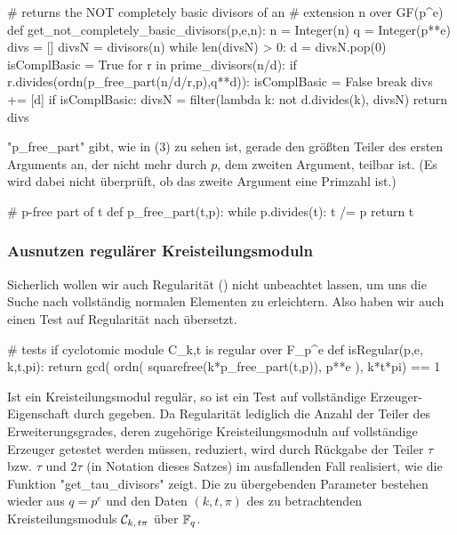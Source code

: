 \begin{sagecode}[caption={[\texttt{get\_not\_completely\_basic\_divisors} aus 
 \url{../Sage/enumeratePCNs.spyx}]Aus \url{../Sage/enumeratePCNs.spyx}},
  label=lst:get_completely_basic_divisors]
# returns the NOT completely basic divisors of an 
# extension n over GF(p^e)
def get_not_completely_basic_divisors(p,e,n):
    n = Integer(n)
    q = Integer(p**e)
    divs = []
    divsN = divisors(n)
    while len(divsN) > 0:
        d = divsN.pop(0)
        isComplBasic = True
        for r in prime_divisors(n/d):
            if r.divides(ordn(p_free_part(n/d/r,p),q**d)):
                isComplBasic = False
                break
        divs += [d]
        if isComplBasic: 
            divsN = filter(lambda k: not d.divides(k), divsN)
    return divs
\end{sagecode}

"p_free_part" gibt, wie in  (3) zu sehen ist,
gerade den größten Teiler des ersten Arguments an, der nicht mehr durch $p$,
dem zweiten Argument, teilbar ist. (Es wird dabei nicht überprüft, ob das zweite
Argument eine Primzahl ist.)


\begin{sagecode}[caption={[\texttt{p\_free\_part} aus 
 \url{../Sage/enumeratePCNs.spyx}]Aus \url{../Sage/enumeratePCNs.spyx}}]
# p-free part of t
def p_free_part(t,p):
    while p.divides(t):
        t /= p
    return t
\end{sagecode}




\subsubsection{Ausnutzen regulärer Kreisteilungsmoduln}

Sicherlich wollen wir auch Regularität () nicht unbeachtet
lassen, um uns die Suche nach vollständig normalen Elementen zu erleichtern.
Also haben wir auch einen Test auf Regularität nach \sage übersetzt.

\begin{sagecode}[caption={[\texttt{isRegular} aus 
 \url{../Sage/enumeratePCNs.spyx}]Aus \url{../Sage/enumeratePCNs.spyx}}]
# tests if cyclotomic module C_k,t is regular over F_p^e
def isRegular(p,e, k,t,pi):
    return gcd( ordn( squarefree(k*p_free_part(t,p)), p**e ),  k*t*pi) == 1
\end{sagecode}

Ist ein Kreisteilungsmodul regulär, so ist ein Test auf vollständige
Erzeuger-Eigenschaft durch  gegeben.
Da Regularität lediglich die Anzahl der Teiler des Erweiterungsgrades, deren
zugehörige Kreisteilungsmoduln auf vollständige Erzeuger getestet werden
müssen, reduziert, wird  durch Rückgabe der
Teiler $\tau$ bzw. $\tau$ und $2\tau$ (in Notation dieses Satzes)
im ausfallenden Fall realisiert, wie die Funktion 
"get_tau_divisors" zeigt. Die zu übergebenden Parameter bestehen wieder aus 
$q = p^e$ und den Daten $(k,t,\pi)$ des zu betrachtenden Kreisteilungsmoduls 
$\mathcal{C}_{k,\,t\pi}$ über $\mathbb{F}_q$.

